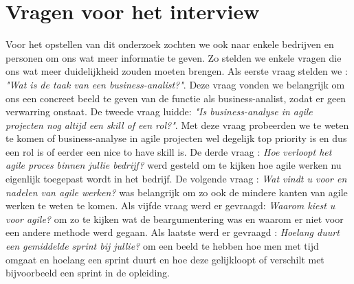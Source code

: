 \documentclass{hogent-article}
\begin{document}
\section{Vragen voor het interview}
Voor het opstellen van dit onderzoek zochten we ook naar enkele bedrijven en personen om ons wat meer informatie te geven. Zo stelden we enkele vragen die ons wat meer duidelijkheid zouden moeten brengen. Als eerste vraag stelden we : \textit{"Wat is de taak van een business-analist?"}. Deze vraag vonden we belangrijk om ons een concreet beeld te geven van de functie als business-analist, zodat er geen verwarring onstaat. De tweede vraag luidde: \textit{"Is business-analyse in agile projecten nog altijd een skill of een rol?"}. Met deze vraag probeerden we te weten te komen of business-analyse in agile projecten wel degelijk top priority is en dus een rol is of eerder een nice to have skill is. De derde vraag : \textit{Hoe verloopt het agile proces binnen jullie bedrijf?} werd gesteld om te kijken hoe agile werken nu eigenlijk toegepast wordt in het bedrijf. De volgende vraag : \textit{Wat vindt u voor en nadelen van agile werken?} was belangrijk om zo ook de mindere kanten van agile werken te weten te komen. Als vijfde vraag werd er gevraagd: \textit{Waarom kiest u voor agile?} om zo te kijken wat de beargumentering was en waarom er niet voor een andere methode werd gegaan. Als laatste werd er gevraagd : \textit{Hoelang duurt een gemiddelde sprint bij jullie?} om een beeld te hebben hoe men met tijd omgaat en hoelang een sprint duurt en hoe deze gelijkloopt of verschilt met bijvoorbeeld een sprint in de opleiding.
\end{document}
